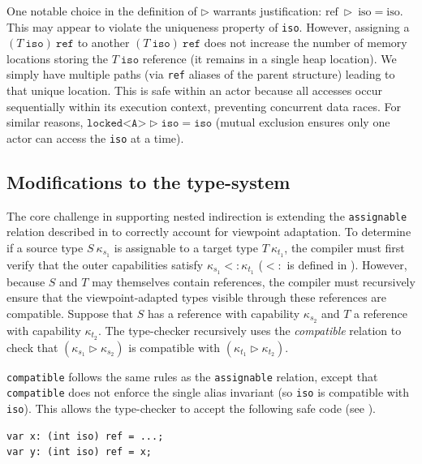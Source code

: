 One notable choice in the definition of $\triangleright$ warrants justification: $\text{ref}\ \triangleright\ \text{iso} = \text{iso}$. This may appear to violate the uniqueness property of \texttt{iso}. However, assigning a $(T\ \texttt{iso})\ \texttt{ref}$ to another $(T\ \texttt{iso})\ \texttt{ref}$ does not increase the number of memory locations storing the $T\ \texttt{iso}$ reference (it remains in a single heap location). We simply have multiple paths (via \texttt{ref} aliases of the parent structure) leading to that unique location. This is safe within an actor because all accesses occur sequentially within its execution context, preventing concurrent data races. For similar reasons, $\texttt{locked<A>} \triangleright \texttt{iso} = \texttt{iso}$ (mutual exclusion ensures only one actor can access the \texttt{iso} at a time).

\subsection{Modifications to the type-system} \label{sec:extension-typing-rules}
The core challenge in supporting nested indirection is extending the \texttt{assignable} relation described in  to correctly account for viewpoint adaptation. To determine if a source type $S\ \kappa_{s_1}$ is assignable to a target type $T\ \kappa_{t_1}$, the compiler must first verify that the outer capabilities satisfy $\kappa_{s_1} <: \kappa_{t_1}$ ($<:$ is defined in ). However, because $S$ and $T$ may themselves contain references, the compiler must recursively ensure that the viewpoint-adapted types visible through these references are compatible. Suppose that $S$ has a reference with capability $\kappa_{s_2}$ and $T$ a reference with capability $\kappa_{t_2}$. The type-checker recursively uses the \textit{compatible} relation to check that $(\kappa_{s_1} \triangleright \kappa_{s_2})$ is compatible with $(\kappa_{t_1} \triangleright \kappa_{t_2})$.

\texttt{compatible} follows the same rules as the \texttt{assignable} relation, except that \texttt{compatible} does not enforce the single alias invariant (so \texttt{iso} is compatible with \texttt{iso}). This allows the type-checker to accept the following safe code (see ).
\begin{verbatim}
var x: (int iso) ref = ...;
var y: (int iso) ref = x;
\end{verbatim}

